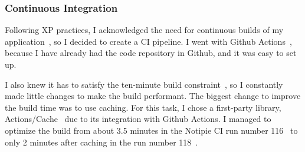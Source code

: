 \subsubsection{Continuous Integration}\label{sec:continuous-integration}

Following \ac{XP} practices,
I acknowledged the need for
continuous builds of my application~\cite{beck_extreme_2004},
so I decided to create a \ac{CI} pipeline.
I went with Github Actions~\cite{github_inc_github_2022-1},
because I have already had
the code repository in Github,
and it was easy to set up.

I also knew it has to satisfy
the ten-minute build constraint~\cite{beck_extreme_2004},
so I constantly made little changes
to make the build performant.
The biggest change to improve
the build time was to use caching.
For this task, I chose a first-party library,
Actions/Cache~\cite{sharma_actionscache_2022}
due to its integration with Github Actions.
I managed to optimize the build
from about 3.5 minutes
in the Notipie \ac{CI} run number 116~
to only 2 minutes after caching
in the run number 118~.

